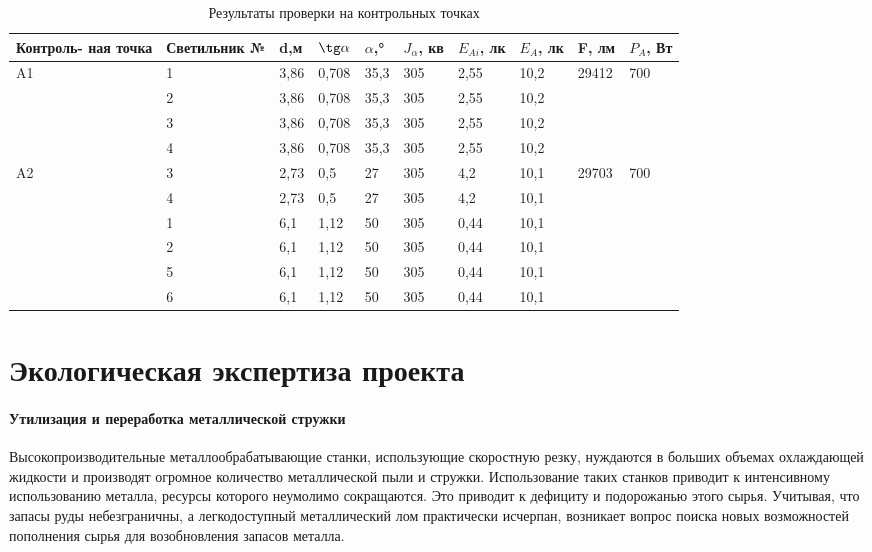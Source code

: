 \begin{table}[!h]
	\begin{center}
		\caption{Результаты проверки на контрольных точках}
		\begin{tabular}{|p{22mm}|
			p{25mm}|
			p{8mm}|
			p{12mm}|
			p{10mm}|
			p{10mm}|
			p{10mm}|
			p{10mm}|
			p{11mm}|
			p{8mm}|
		}
	\hline
	Контроль- ная точка  & Светильник № & d,м & $\tg \alpha$ & $\alpha$,° & $J_\alpha$, кв & $E_{Ai}$, лк & $E_A$, лк & F, лм & $P_A$, Вт  \\
	\hline
 	A1 & 1 & 3,86 & 0,708 & 35,3&  305 &2,55 & 10,2 & 29412 & 700 \\
	\cline {2-8}
& 2 & 3,86 & 0,708 & 35,3 & 305 & 2,55 & 10,2 & & \\ 
	\cline {2-8}
& 3 & 3,86 & 0,708 & 35,3 & 305 & 2,55 & 10,2 & & \\
	\cline {2-8}
& 4 & 3,86 & 0,708 & 35,3 & 305 & 2,55 & 10,2 & & \\
	\hline
 	A2 & 3 & 2,73 & 0,5 & 27 &  305 & 4,2 & 10,1 & 29703  & 700 \\
	\cline {2-8}
& 4 & 2,73 & 0,5 & 27 & 305 & 4,2 & 10,1 & & \\
	\cline {2-8}
& 1 & 6,1 & 1,12 & 50 & 305 & 0,44 & 10,1 & & \\
	\cline {2-8}
& 2 & 6,1 & 1,12 & 50 & 305 & 0,44 & 10,1 & & \\
	\cline {2-8}
& 5 & 6,1 & 1,12 & 50 & 305 & 0,44 & 10,1 & & \\
	\cline {2-8}
& 6 & 6,1 & 1,12 & 50 & 305 & 0,44 & 10,1 & & \\
	\hline
		\end{tabular}
		\label{tab:ecolog_results}
	\end{center}
\end{table}

\section{Экологическая экспертиза проекта}
\paragraph{Утилизация и переработка металлической стружки}
Высокопроизводительные металлообрабатывающие станки, использующие скоростную резку, нуждаются в больших объемах охлаждающей жидкости и производят огромное количество металлической пыли и стружки. Использование таких станков приводит к интенсивному использованию металла, ресурсы которого неумолимо сокращаются. Это приводит к дефициту и подорожанью этого сырья. Учитывая, что запасы руды небезграничны, а легкодоступный металлический лом практически исчерпан, возникает вопрос поиска новых возможностей пополнения сырья для возобновления запасов металла.

